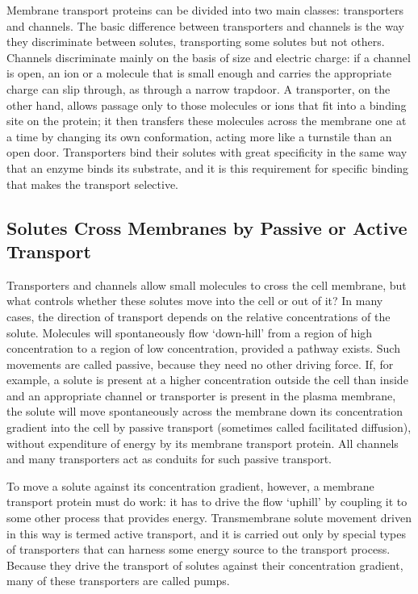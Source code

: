 Membrane transport proteins can be divided into two main classes:
transporters and channels. The basic difference between transporters
and channels is the way they discriminate between solutes, transporting
some solutes but not others. Channels discriminate mainly
on the basis of size and electric charge: if a channel is open, an ion or a
molecule that is small enough and carries the appropriate charge can slip
through, as through a narrow trapdoor. A transporter, on the other hand,
allows passage only to those molecules or ions that fit into a binding
site on the protein; it then transfers these molecules across the membrane
one at a time by changing its own conformation, acting more like
a turnstile than an open door. Transporters bind their solutes with great
specificity in the same way that an enzyme binds its substrate, and it is
this requirement for specific binding that makes the transport selective.

\subsection{Solutes Cross Membranes by Passive or Active Transport}

Transporters and channels allow small molecules to cross the cell membrane,
but what controls whether these solutes move into the cell or out
of it? In many cases, the direction of transport depends on the relative
concentrations of the solute. Molecules will spontaneously flow ‘down-hill’
from a region of high concentration to a region of low concentration,
provided a pathway exists. Such movements are called passive, because
they need no other driving force. If, for example, a solute is present at
a higher concentration outside the cell than inside and an appropriate
channel or transporter is present in the plasma membrane, the solute
will move spontaneously across the membrane down its concentration
gradient into the cell by passive transport (sometimes called facilitated
diffusion), without expenditure of energy by its membrane transport protein.
All channels and many transporters act as conduits for such passive
transport.

To move a solute against its concentration gradient, however, a membrane
transport protein must do work: it has to drive the flow ‘uphill’
by coupling it to some other process that provides energy. Transmembrane solute movement
driven in this way is termed active transport, and it is carried out only
by special types of transporters that can harness some energy source to
the transport process. Because they drive the transport of
solutes against their concentration gradient, many of these transporters
are called pumps.

